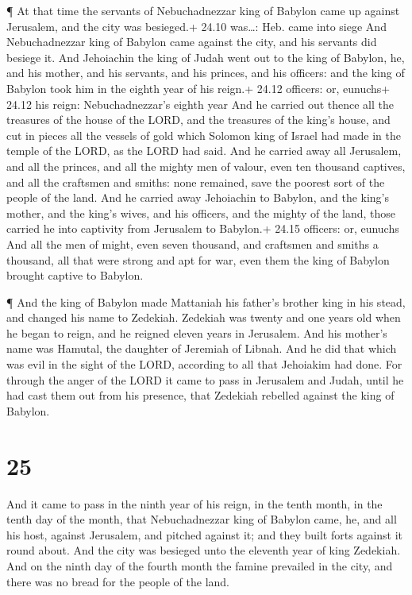  ¶ At that time the servants of Nebuchadnezzar king of
Babylon came up against Jerusalem, and the city was besieged.+ 24.10
was\ldots: Heb. came into siege  And Nebuchadnezzar king of
Babylon came against the city, and his servants did besiege it.
 And Jehoiachin the king of Judah went out to the king of
Babylon, he, and his mother, and his servants, and his princes, and his
officers: and the king of Babylon took him in the eighth year of his
reign.+ 24.12 officers: or, eunuchs+ 24.12 his reign: Nebuchadnezzar's
eighth year  And he carried out thence all the treasures of
the house of the LORD, and the treasures of the king's house, and cut in
pieces all the vessels of gold which Solomon king of Israel had made in
the temple of the LORD, as the LORD had said.  And he
carried away all Jerusalem, and all the princes, and all the mighty men
of valour, even ten thousand captives, and all the craftsmen and smiths:
none remained, save the poorest sort of the people of the land.
 And he carried away Jehoiachin to Babylon, and the king's
mother, and the king's wives, and his officers, and the mighty of the
land, those carried he into captivity from Jerusalem to Babylon.+ 24.15
officers: or, eunuchs  And all the men of might, even seven
thousand, and craftsmen and smiths a thousand, all that were strong and
apt for war, even them the king of Babylon brought captive to Babylon.

 ¶ And the king of Babylon made Mattaniah his father's
brother king in his stead, and changed his name to Zedekiah.
 Zedekiah was twenty and one years old when he began to
reign, and he reigned eleven years in Jerusalem. And his mother's name
was Hamutal, the daughter of Jeremiah of Libnah.  And he
did that which was evil in the sight of the LORD, according to all that
Jehoiakim had done.  For through the anger of the LORD it
came to pass in Jerusalem and Judah, until he had cast them out from his
presence, that Zedekiah rebelled against the king of Babylon.

\hypertarget{section-24}{%
\section{25}\label{section-24}}

 And it came to pass in the ninth year of his reign, in the
tenth month, in the tenth day of the month, that Nebuchadnezzar king of
Babylon came, he, and all his host, against Jerusalem, and pitched
against it; and they built forts against it round about. 
And the city was besieged unto the eleventh year of king Zedekiah.
 And on the ninth day of the fourth month the famine
prevailed in the city, and there was no bread for the people of the
land.

